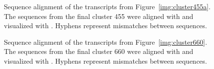 \documentclass[12pt,a4paper,english]{article}
\begin{document}
\begin{figure}
	\centering
	\def\svgwidth{\textwidth}
	
	\caption[Sequence alignment of the transcripts from Figure~\ref{img:cluster455a}.]{Sequence alignment of the transcripts from Figure~\ref{img:cluster455a}. The sequences from the final cluster 455 were aligned with \muscle \citep{muscle:04} and visualized with \jalview \citep{jalview:09}. Hyphens represent mismatches between sequences.}
	\label{img:aln:case2}
\end{figure}


\begin{figure}
	\def\svgwidth{\textwidth}
	\centering
	
	\caption[Sequence alignment of the transcripts from Figure~\ref{img:cluster660}.]{Sequence alignment of the transcripts from Figure~\ref{img:cluster660}. The sequences from the final cluster 660 were aligned with \muscle \citep{muscle:04} and visualized with \jalview \citep{jalview:09}. Hyphens represent mismatches between sequences.}
	\label{img:aln:case3}
\end{figure}
\end{document}
